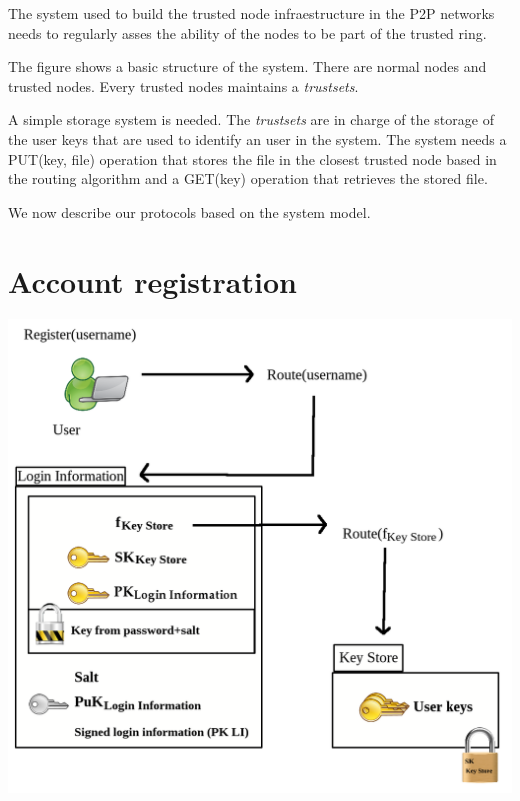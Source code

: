 The system used to build the trusted node infraestructure in the P2P networks
needs to regularly asses the ability of the nodes to be part of the trusted
ring.

The figure shows a basic structure of the system. There are normal nodes and
trusted nodes. Every trusted nodes maintains a \textit{trustsets}.

A simple storage system is needed.
The \textit{trustsets} are in charge of the storage of the user keys that are
used to identify an user in the system. The system needs a PUT(key,
file) operation that stores the file in the closest trusted node based in the
routing algorithm and a GET(key) operation that retrieves the stored file.


We now describe our protocols based on the system model. 

\section{Account registration}
\includegraphics[width=14cm]{../img/user_registration}\\

